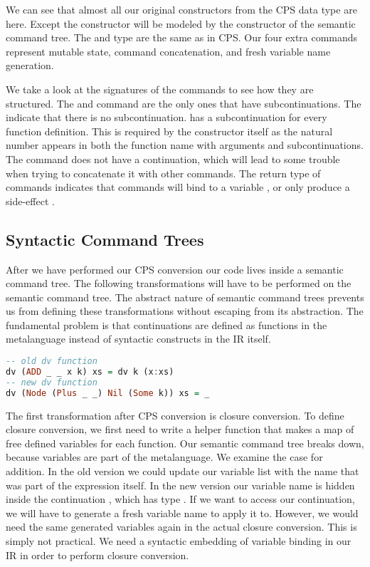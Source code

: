 We can see that almost all our original constructors from the \ac{CPS} data type are here. Except the  constructor will be modeled by the  constructor of the semantic command tree. The  and  type are the same as in \ac{CPS}. Our four extra commands represent mutable state, command concatenation, and fresh variable name generation.

We take a look at the signatures of the commands to see how they are structured. The  and  command are the only ones that have subcontinuations. The  indicate that there is no subcontinuation.  has a subcontinuation for every function definition. This is required by the constructor itself as the natural number  appears in both the function name with arguments and subcontinuations. The  command does not have a continuation, which will lead to some trouble when trying to concatenate it with other commands. The return type of commands indicates that commands will bind to a variable , or only produce a side-effect \icode{()}.

\subsection{\label{subsection:syntree}Syntactic Command Trees}
After we have performed our \ac{CPS} conversion our code lives inside a semantic command tree. The following transformations will have to be performed on the semantic command tree. The abstract nature of semantic command trees prevents us from defining these transformations without escaping from its abstraction. The fundamental problem is that continuations are defined as functions in the metalanguage instead of syntactic constructs in the \ac{IR} itself.

\begin{lstlisting}[language=Haskell]
-- old dv function
dv (ADD _ _ x k) xs = dv k (x:xs)
-- new dv function
dv (Node (Plus _ _) Nil (Some k)) xs = _
\end{lstlisting}

The first transformation after \ac{CPS} conversion is closure conversion. To define closure conversion, we first need to write a helper function  that makes a map of free defined variables for each function. Our semantic command tree breaks down, because variables are part of the metalanguage. We examine the case for addition. In the old version we could update our variable list with the name  that was part of the  expression itself. In the new version our variable name is hidden inside the continuation , which has type . If we want to access our continuation, we will have to generate a fresh variable name to apply it to. However, we would need the same generated variables again in the actual closure conversion. This is simply not practical. We need a syntactic embedding of variable binding in our \ac{IR} in order to perform closure conversion.

